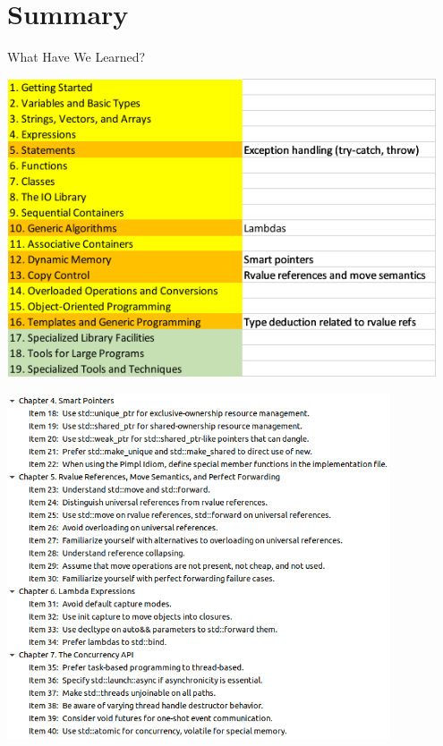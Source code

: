 \section{Summary}

\begin{frame}{What Have We Learned?}
    \begin{center}
        \includegraphics[width = 0.95\textwidth]{img/contents.png}
    \end{center}
\end{frame}

\begin{frame}
    \begin{center}
        \includegraphics[width=0.85\textwidth]{img/effectivemodern.png}
    \end{center}
\end{frame}

